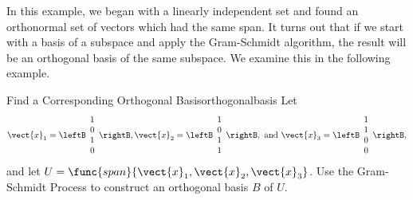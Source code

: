 In this example, we began with a linearly independent set and found an orthonormal set of vectors which had the same span. It turns out that if we start with a basis of a subspace and apply the Gram-Schmidt algorithm, the result will be an orthogonal basis of the same subspace. We examine this in the following example. 

\begin{example}{Find a Corresponding Orthogonal Basis}{orthogonalbasis}
Let
\[ \vect{x}_1=\leftB\begin{array}{c} 1\\ 0\\ 1\\ 0 \end{array}\rightB,
\vect{x}_2=\leftB\begin{array}{c} 1\\ 0\\ 1\\ 1 \end{array}\rightB,
\mbox{ and }
\vect{x}_3=\leftB\begin{array}{c} 1\\ 1\\ 0\\ 0 \end{array}\rightB,\]
and let $U=\func{span}\{\vect{x}_1, \vect{x}_2,\vect{x}_3\}$. Use the Gram-Schmidt Process
to construct an orthogonal basis $B$ of $U$. 
\end{example}

